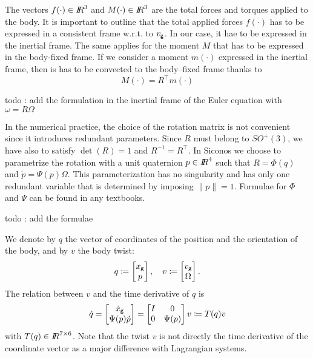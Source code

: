 The vectors $f(\cdot)\in \mbox{\rm $I\!\!R$}^3$ and $M(\cdot)\in \mbox{\rm $I\!\!R$}^3$ are the total forces and torques applied to the body. It is important to outline that the total applied forces $f(\cdot)$ has to be expressed in a consistent frame w.r.t. to $v_{\sf \small g}$. In our case, it hae to be expressed in the inertial frame. The same applies for the moment $M$ that has to be expressed in the body-fixed frame. If we consider a moment $m(\cdot)$ expressed in the inertial frame, then is has to be convected to  the body--fixed frame thanks to
\begin{equation}
  \label{eq:convected_moment}
  M (\cdot) =R^\top  m (\cdot)
\end{equation}

\begin{ndrva}
  todo : add the formulation in the inertial frame of the Euler equation with $\omega =R \Omega$
\end{ndrva}

In the numerical practice, the choice of the rotation matrix is not convenient since it introduces redundant parameters. Since $R$ must belong to $SO^+(3)$, we have also to satisfy $\det(R)=1$ and $R^{-1}=R^\top$. In Siconos we choose to parametrize the rotation with a unit quaternion $p \in \mbox{\rm $I\!\!R$}^4$ such that $R = \Phi(q)$ and $\dot p = \Psi(p)\Omega $. This parameterization has no singularity and has only one redundant variable that is determined by imposing $\|p\|=1$. Formulae for $\Phi$ and $\Psi$ can be found in any textbooks.

\begin{ndrva}
  todo : add the formulae
\end{ndrva}

We denote  by $q$ the vector of coordinates of the position and the orientation of the body, and by $v$ {the body twist}:
\begin{equation}
  q \coloneqq \begin{bmatrix}
    x_{\sf \small g}\\
    p
  \end{bmatrix},\quad 
  v \coloneqq \begin{bmatrix}
     v_{\sf \small g}\\
     \Omega
   \end{bmatrix}.
 \end{equation}
 The relation between $v$ and the time derivative of $q$ is
\begin{equation}
  \label{eq:TT}
  \dot q = 
  \begin{bmatrix}
     \dot x_{\sf \small g}\\
     \Psi(p) \dot p
   \end{bmatrix}
   = 
   \begin{bmatrix}
     I & 0 \\
     0 & \Psi(p)
   \end{bmatrix}
   v
   \coloneqq
   T(q) v
\end{equation}
with $T(q) \in \mbox{\rm $I\!\!R$}^{7\times 6}$.
{Note that the twist $v$ is not directly the time derivative of the coordinate vector as a major difference with Lagrangian systems. }



